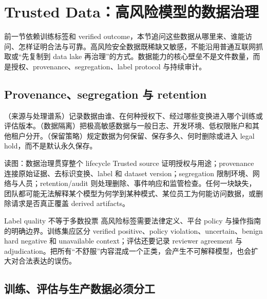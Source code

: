 \section{Trusted Data：高风险模型的数据治理}

前一节依赖训练标签和 verified outcome，本节追问这些数据从哪里来、谁能访问、怎样证明合法与可靠。高风险安全数据既稀缺又敏感，不能沿用普通互联网抓取或“先复制到 data lake 再治理”的方式。数据能力的核心壁垒不是文件数量，而是授权、provenance、segregation、label protocol 与持续审计。

\subsection{Provenance、segregation 与 retention}

（来源与处理谱系）记录数据由谁、在何种授权下、经过哪些变换进入哪个训练或评估版本。（数据隔离）把极高敏感数据与一般日志、开发环境、低权限账户和其他租户分开。（保留策略）规定数据为何保留、保存多久、何时删除或进入 legal hold，而不是默认永久保存。


\begin{knowledgebox}{读图：数据治理贯穿整个 lifecycle}
Trusted source 证明授权与用途；provenance 连接原始证据、去标识变换、label 和 dataset version；segregation 限制环境、网络与人员；retention/audit 则处理删除、事件响应和监管检查。任何一块缺失，团队都可能无法解释某个模型为何学到某种模式、某位员工为何能访问数据，或删除请求是否真正覆盖 derived artifacts。
\end{knowledgebox}

\begin{importantbox}{Label quality 不等于多数投票}
高风险标签需要法律定义、平台 policy 与操作指南的明确边界。训练集应区分 verified positive、policy violation、uncertain、benign hard negative 和 unavailable context；评估还要记录 reviewer agreement 与 adjudication。把所有“不舒服”内容混成一个正类，会产生不可解释模型，也会扩大对合法表达的误伤。
\end{importantbox}


\subsection{训练、评估与生产数据必须分工}


